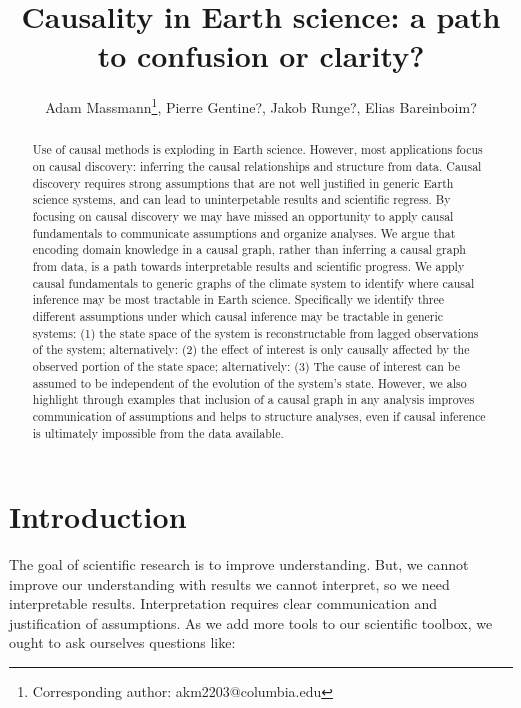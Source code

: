 \documentclass[12pt]{article}
\begin{document}
\title{Causality in Earth science: a path to confusion or clarity?}

\author{Adam Massmann\thanks{Corresponding author:
    akm2203@columbia.edu}, Pierre Gentine?, Jakob Runge?, Elias Bareinboim?}

\maketitle
\begin{abstract}
  Use of causal methods is exploding in Earth science. However, most
  applications focus on causal discovery: inferring the causal
  relationships and structure from data. Causal discovery requires
  strong assumptions that are not well justified in generic Earth
  science systems, and can lead to uninterpetable results and
  scientific regress. By focusing on causal discovery we may have
  missed an opportunity to apply causal fundamentals to communicate
  assumptions and organize analyses. We argue that encoding domain
  knowledge in a causal graph, rather than inferring a causal graph
  from data, is a path towards interpretable results and scientific
  progress. We apply causal fundamentals to generic graphs of the
  climate system to identify where causal inference may be most
  tractable in Earth science. Specifically we identify three different
  assumptions under which causal inference may be tractable in generic
  systems: (1) the state space of the system is reconstructable from
  lagged observations of the system; alternatively: (2) the effect of
  interest is only causally affected by the observed portion of the
  state space; alternatively: (3) The cause of interest can be assumed
  to be independent of the evolution of the system’s state. However,
  we also highlight through examples that inclusion of a causal graph
  in any analysis improves communication of assumptions and helps to
  structure analyses, even if causal inference is ultimately
  impossible from the data available.

\end{abstract}

\section{Introduction}


The goal of scientific research is to improve understanding. But, we
cannot improve our understanding with results we cannot interpret, so
we need interpretable results. Interpretation requires clear
communication and justification of assumptions. As we add more tools
to our scientific toolbox, we ought to ask ourselves questions like:
\end{document}
